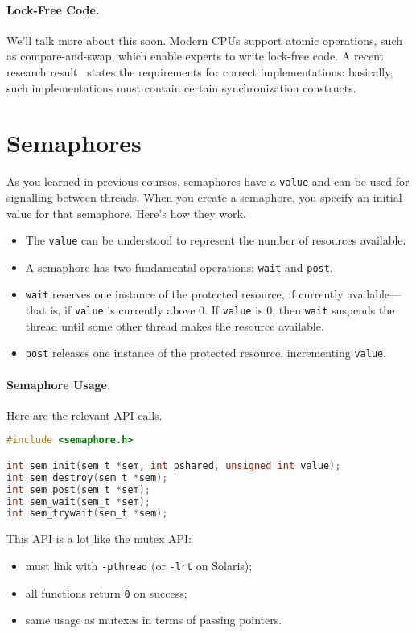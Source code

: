 \paragraph{Lock-Free Code.} We'll talk more about this soon.
Modern CPUs support atomic operations, such as compare-and-swap, which
enable experts to write lock-free code. A recent research 
result~\cite{mckenney11:_concur,Attiya:2011:LOE:1926385.1926442} states the requirements for correct implementations: basically,
such implementations must contain certain synchronization constructs.

\section*{Semaphores}
As you learned in previous courses, semaphores have a {\tt value} and
can be used for signalling between threads. When you create a semaphore,
you specify an initial value for that semaphore. Here's how they work.

\begin{itemize}
\item The {\tt value} can be understood to represent the number of resources available.
\item A semaphore has two fundamental operations: {\tt wait} and 
{\tt post}.
\item {\tt wait} reserves one instance of the protected resource, if currently
available---that is, if {\tt value} is currently above 0. If {\tt value} 
is 0, then {\tt wait} suspends the thread until some other thread makes
the resource available.
\item {\tt post} releases one instance of the protected resource,
incrementing {\tt value}.
\end{itemize}

\paragraph{Semaphore Usage.} Here are the relevant API calls.
  \begin{lstlisting}[language=C]
#include <semaphore.h>

int sem_init(sem_t *sem, int pshared, unsigned int value);
int sem_destroy(sem_t *sem);
int sem_post(sem_t *sem);
int sem_wait(sem_t *sem);
int sem_trywait(sem_t *sem);
  \end{lstlisting}

This API is a lot like the mutex API:
  \begin{itemize}
    \item must link with {\tt -pthread} (or {\tt -lrt} on Solaris);
    \item all functions return {\tt 0} on success;
    \item same usage as mutexes in terms of passing pointers.
  \end{itemize}

